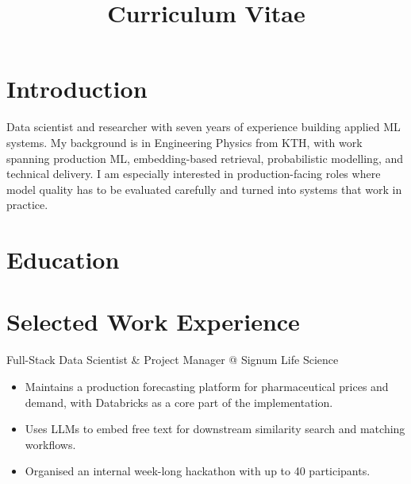 \documentclass[11pt,a4paper]{moderncv}
\title{Curriculum Vitae}
\begin{document}
\makecvtitle

\section*{Introduction}
Data scientist and researcher with seven years of experience building applied ML systems. My background is in Engineering Physics from KTH, with work spanning production ML, embedding-based retrieval, probabilistic modelling, and technical delivery.
\newline\hspace*{2em}
I am especially interested in production-facing roles where model quality has to be evaluated carefully and turned into systems that work in practice.

\section{Education}




\section{Selected Work Experience}

\large{Full-Stack Data Scientist \& Project Manager @ Signum Life Science}
\normalsize
\begin{itemize}
    \item Maintains a production forecasting platform for pharmaceutical prices and demand, with Databricks as a core part of the implementation.
    \item Uses LLMs to embed free text for downstream similarity search and matching workflows.
    \item Organised an internal week-long hackathon with up to 40 participants.
\end{itemize}
\end{document}
